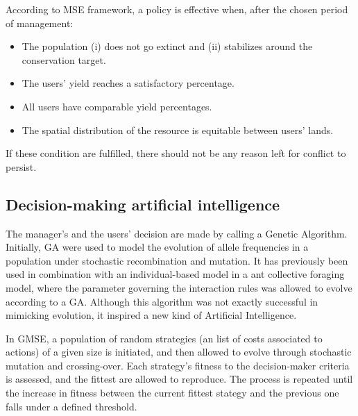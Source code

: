 \documentclass[12pt,a4paper]{article}
\begin{document}
According to MSE framework, a policy is effective when, after the chosen period of management:
\begin{itemize}
    \item The population (i) does not go extinct and (ii) stabilizes around the conservation target.
    \item The users' yield reaches a satisfactory percentage.
    \item All users have comparable yield percentages.
    \item The spatial distribution of the resource is equitable between users' lands.
\end{itemize}
If these condition are fulfilled, there should not be any reason left for conflict to persist.

\subsection{Decision-making artificial intelligence}

The manager's and the users' decision are made by calling a Genetic Algorithm.
Initially, GA were used to model the evolution of allele frequencies in a population under stochastic recombination and mutation.
It has previously been used in combination with an individual-based model in a ant collective foraging model, where the parameter governing the interaction rules was allowed to evolve according to a GA. \citep{hamblin2013practical}
Although this algorithm was not exactly successful in mimicking evolution, it inspired a new kind of Artificial Intelligence.

In GMSE, a population of random strategies (an list of costs associated to actions) of a given size is initiated, and then allowed to evolve through stochastic mutation and crossing-over.
Each strategy's fitness to the decision-maker criteria is assessed, and the fittest are allowed to reproduce.
The process is repeated until the increase in fitness between the current fittest stategy and the previous one falls under a defined threshold.
\end{document}
